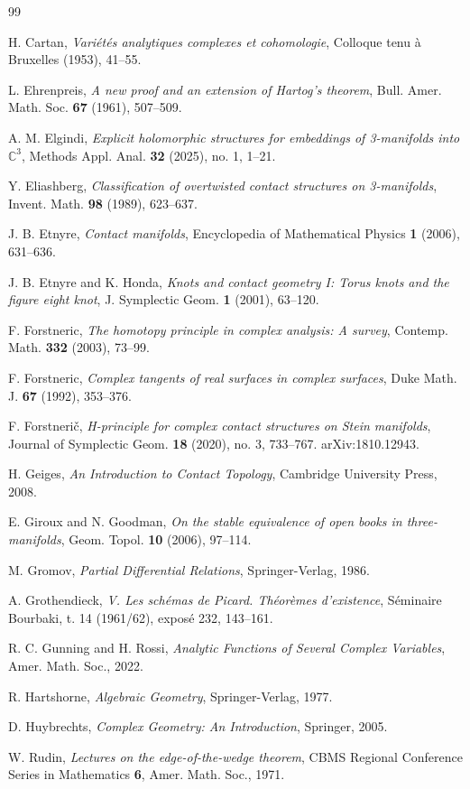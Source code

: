 \documentclass{amsart}
\newcommand{\C}{\mathbb{C}}
\begin{document}
\begin{thebibliography}{99}

 H. Cartan, \textit{Vari\'et\'es analytiques complexes et cohomologie}, Colloque tenu \`a Bruxelles (1953), 41–55.

 L. Ehrenpreis, \textit{A new proof and an extension of Hartog's theorem}, Bull. Amer. Math. Soc. \textbf{67} (1961), 507–509.

 A. M. Elgindi, \textit{Explicit holomorphic structures for embeddings of 3-manifolds into $\C^3$}, Methods Appl. Anal. \textbf{32} (2025), no. 1, 1–21.

 Y. Eliashberg, \textit{Classification of overtwisted contact structures on 3-manifolds}, Invent. Math. \textbf{98} (1989), 623–637.

 J. B. Etnyre, \textit{Contact manifolds}, Encyclopedia of Mathematical Physics \textbf{1} (2006), 631–636.

 J. B. Etnyre and K. Honda, \textit{Knots and contact geometry I: Torus knots and the figure eight knot}, J. Symplectic Geom. \textbf{1} (2001), 63–120.

 F. Forstneric, \textit{The homotopy principle in complex analysis: A survey}, Contemp. Math. \textbf{332} (2003), 73–99.

 F. Forstneric, \textit{Complex tangents of real surfaces in complex surfaces}, Duke Math. J. \textbf{67} (1992), 353–376.

 F. Forstnerič,
\emph{H-principle for complex contact structures on Stein manifolds},
Journal of Symplectic Geom. \textbf{18} (2020), no. 3, 733–767.
arXiv:1810.12943.

 H. Geiges, \textit{An Introduction to Contact Topology}, Cambridge University Press, 2008.

 E. Giroux and N. Goodman, \textit{On the stable equivalence of open books in three-manifolds}, Geom. Topol. \textbf{10} (2006), 97–114.

 M. Gromov, \textit{Partial Differential Relations}, Springer-Verlag, 1986.

 A. Grothendieck, \textit{V. Les sch\'emas de Picard. Th\'eor\`emes d'existence}, S\'eminaire Bourbaki, t. 14 (1961/62), expos\'e 232, 143–161.

 R. C. Gunning and H. Rossi, \textit{Analytic Functions of Several Complex Variables}, Amer. Math. Soc., 2022.

 R. Hartshorne, \textit{Algebraic Geometry}, Springer-Verlag, 1977.

 D. Huybrechts, \textit{Complex Geometry: An Introduction}, Springer, 2005.

 W. Rudin, \textit{Lectures on the edge-of-the-wedge theorem}, CBMS Regional Conference Series in Mathematics \textbf{6}, Amer. Math. Soc., 1971.

\end{thebibliography}
\end{document}
